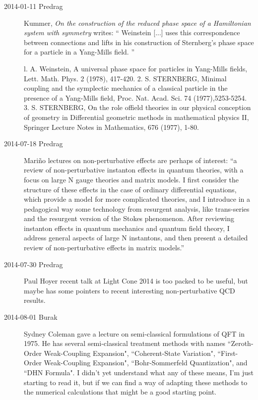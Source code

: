 \begin{description}
\item[2014-01-11 Predrag]
Kummer, {\em On the construction of the reduced phase space
of a {Hamiltonian} system with symmetry} writes:
``
Weinstein [...] uses this correspondence between connections
and lifts in his construction of Sternberg's phase space for a
particle in a Yang-Mills field.
''

l. A. Weinstein, A universal phase space for particles in Yang-Mills fields, Lett. Math. Phys.
2 (1978), 417-420.
2. S. STERNBERG, Minimal coupling and the symplectic mechanics of a classical particle in
the presence of a Yang-Mills field, Proc. Nat. Acad. Sci. 74 (1977),5253-5254.
3. S. STERNBERG, On the role offield theories in our physical conception of geometry in Differential
geometric methods in mathematical physics II, Springer Lecture Notes in Mathematics,
676 (1977), 1-80.

\item[2014-07-18 Predrag]
Mari\~no lectures on non-perturbative effects are perhaps of
interest:
 ``a review of non-perturbative
instanton effects in quantum theories, with a focus on large N gauge
theories and matrix models. I first consider the structure of these
effects in the case of ordinary differential equations, which provide a
model for more complicated theories, and I introduce in a pedagogical way
some technology from resurgent analysis, like trans-series and the
resurgent version of the Stokes phenomenon. After reviewing instanton
effects in quantum mechanics and quantum field theory, I address general
aspects of large N instantons, and then present a detailed review of
non-perturbative effects in matrix models.''

\item[2014-07-30 Predrag]
Paul Hoyer recent talk at
{Light Cone 2014} is too packed to be useful, but maybe has some pointers
to recent interesting non-perturbative QCD results.

\item[2014-08-01 Burak]
Sydney Coleman gave a lecture on semi-classical formulations of QFT in 1975.
He has several semi-classical treatment methods with names
``Zeroth-Order Weak-Coupling Expansion",
``Coherent-State Variation",
``First-Order Weak-Coupling Expansion",
``Bohr-Sommerfeld Quantization", and
``DHN Formula". I didn't yet understand what any of these means, I'm just starting
to read it, but if we can find a way of adapting these methods to the numerical
calculations that might be a good starting point.


\end{description}
